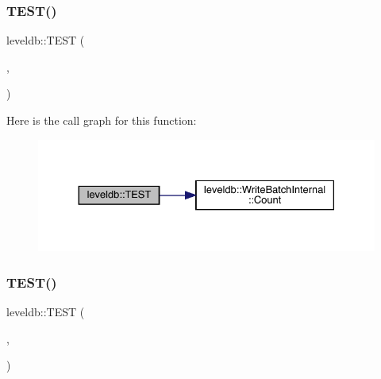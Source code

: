 \mbox{\label{namespaceleveldb_a77a1389346b24fa9b5f9698400c865f6}} 
\subsubsection{\texorpdfstring{TEST()}{TEST()}\hspace{0.1cm}{\footnotesize\ttfamily [7/102]}}
{\footnotesize\ttfamily leveldb\+::\+T\+E\+ST (\begin{DoxyParamCaption}\item[{\mbox{\hyperlink{classleveldb_1_1_write_batch_test}{Write\+Batch\+Test}}}]{,  }\item[{Empty}]{ }\end{DoxyParamCaption})}

Here is the call graph for this function\+:
\nopagebreak
\begin{figure}[H]
\begin{center}
\leavevmode
\includegraphics[width=330pt]{namespaceleveldb_a77a1389346b24fa9b5f9698400c865f6_cgraph}
\end{center}
\end{figure}
\mbox{\label{namespaceleveldb_aede67af3ba40cb44c1ff914d7074ba48}} 
\subsubsection{\texorpdfstring{TEST()}{TEST()}\hspace{0.1cm}{\footnotesize\ttfamily [8/102]}}
{\footnotesize\ttfamily leveldb\+::\+T\+E\+ST (\begin{DoxyParamCaption}\item[{\mbox{\hyperlink{classleveldb_1_1_find_file_test}{Find\+File\+Test}}}]{,  }\item[{Single}]{ }\end{DoxyParamCaption})}

\mbox{\label{namespaceleveldb_af2029a94a0a17d6eb1bfec4d38b7e3a0}} 
